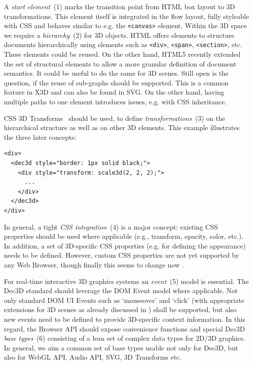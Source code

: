 \documentclass{acmsiggraph}
\begin{document}
A \textit{start element}~(1) marks the transition point from HTML box layout to 3D transformations. This element itself is integrated in the flow layout, fully styleable with CSS and behaves similar to e.g. the \verb|<canvas>| element. Within the 3D space we require a \textit{hierarchy}~(2) for 3D objects. HTML offers elements to structure documents hierarchically using elements such as \verb|<div>|, \verb|<span>|, \verb|<section>|, etc. These elements could be reused. On the other hand, HTML5 recently extended the set of structural elements to allow a more granular definition of document semantics. It could be useful to do the same for 3D scenes. Still open is the question, if the reuse of sub-graphs should be supported. This is a common feature in X3D and can also be found in SVG. On the other hand, having multiple paths to one element introduces issues, e.g. with CSS inheritance. 

CSS 3D Transforms~\cite{webkit3DCSS} should be used, to define \textit{transformations}~(3) on the hierarchical structure as well as on other 3D elements. This example illustrates the three later concepts:

\small
\begin{verbatim}
<div>
  <dec3d style="border: 1px solid black;">
    <div style="transform: scale3d(2, 2, 2);">
      ...
    </div>
  </dec3d>
</div>
\end{verbatim}
\normalsize

In general, a tight \textit{CSS integration}~(4) is a major concept: existing CSS properties should be used where applicable (e.g., transform, opacity, color, etc.). In addition, a set of 3D-specific CSS properties (e.g. for defining the appearance) needs to be defined. However, custom CSS properties are not yet supported by any Web Browser, though finally this seems to change now \cite{CSSCustom}.

For real-time interactive 3D graphics systems an \textit{event}~(5) model is essential. The Dec3D standard should leverage the DOM Event model where applicable. Not only standard DOM UI Events such as `mouseover' and `click' (with appropriate extensions for 3D scenes as already discussed in \cite{BehrJDA11}) shall be supported, but also new events need to be defined to provide 3D-specific context information. In this regard, the Browser API should expose convenience functions and special Dec3D \textit{base types}~(6) consisting of a lean set of complex data types for 2D/3D graphics. In general, we aim a common set of base types usable not only for Dec3D, but also for WebGL API, Audio API, SVG, 3D Transforms etc.
\end{document}
